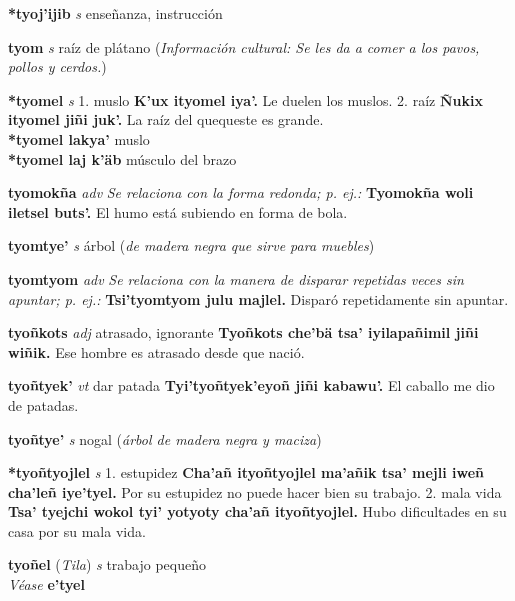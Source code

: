 \documentclass[10pt]{scrbook}
\newcommand{\entry}[1]{\textbf{#1}}
\newcommand{\onedefinition}[1]{#1.}
\newcommand{\nontranslationdef}[1]{\textit{#1}}
\newcommand{\partofspeech}[1]{\textit{#1}}
\newcommand{\spanishtranslation}[1]{#1}
\newcommand{\clarification}[1]{(\textit{#1})}
\newcommand{\cholexample}[1]{\textbf{#1}}
\newcommand{\exampletranslation}[1]{#1}
\newcommand{\alsosee}[1]{\\\textit{Véase} \textbf{#1}}
\newcommand{\relevantdialect}[1]{(\textit{#1})}
\newcommand{\culturalinformation}[1]{(\textit{#1})}
\newcommand{\secondaryentry}[1]{\\\textbf{#1}}
\newcommand{\secondtranslation}[1]{#1}
\begin{document}
\begin{multicols}{2}
\entry{*tyoj'ijib}
\partofspeech{s}
\spanishtranslation{enseñanza, instrucción}

\entry{tyom}
\partofspeech{s}
\spanishtranslation{raíz de plátano}
\culturalinformation{Información cultural: Se les da a comer a los pavos, pollos y cerdos.}

\entry{*tyomel}
\partofspeech{s}
\onedefinition{1}
\spanishtranslation{muslo}
\cholexample{K'ux ityomel iya'.}
\exampletranslation{Le duelen los muslos.}
\onedefinition{2}
\spanishtranslation{raíz}
\cholexample{Ñukix ityomel jiñi juk'.}
\exampletranslation{La raíz del quequeste es grande.}
\secondaryentry{*tyomel lakya'}
\secondtranslation{muslo}
\secondaryentry{*tyomel laj k'äb}
\secondtranslation{músculo del brazo}

\entry{tyomokña}
\partofspeech{adv}
\nontranslationdef{Se relaciona con la forma redonda; p. ej.:}
\cholexample{Tyomokña woli iletsel buts'.}
\exampletranslation{El humo está subiendo en forma de bola.}

\entry{tyomtye'}
\partofspeech{s}
\spanishtranslation{árbol}
\clarification{de madera negra que sirve para muebles}

\entry{tyomtyom}
\partofspeech{adv}
\nontranslationdef{Se relaciona con la manera de disparar repetidas veces sin apuntar; p. ej.:}
\cholexample{Tsi'tyomtyom julu majlel.}
\exampletranslation{Disparó repetidamente sin apuntar.}

\entry{tyoñkots}
\partofspeech{adj}
\spanishtranslation{atrasado, ignorante}
\cholexample{Tyoñkots che'bä tsa' iyilapañimil jiñi wiñik.}
\exampletranslation{Ese hombre es atrasado desde que nació.}

\entry{tyoñtyek'}
\partofspeech{vt}
\spanishtranslation{dar patada}
\cholexample{Tyi'tyoñtyek'eyoñ jiñi kabawu'.}
\exampletranslation{El caballo me dio de patadas.}

\entry{tyoñtye'}
\partofspeech{s}
\spanishtranslation{nogal}
\clarification{árbol de madera negra y maciza}

\entry{*tyoñtyojlel}
\partofspeech{s}
\onedefinition{1}
\spanishtranslation{estupidez}
\cholexample{Cha'añ ityoñtyojlel ma'añik tsa' mejli iweñ cha'leñ iye'tyel.}
\exampletranslation{Por su estupidez no puede hacer bien su trabajo.}
\onedefinition{2}
\spanishtranslation{mala vida}
\cholexample{Tsa' tyejchi wokol tyi' yotyoty cha'añ ityoñtyojlel.}
\exampletranslation{Hubo dificultades en su casa por su mala vida.}

\entry{tyoñel}
\relevantdialect{Tila}
\partofspeech{s}
\spanishtranslation{trabajo pequeño}
\alsosee{e'tyel}


\end{multicols}
\end{document}
